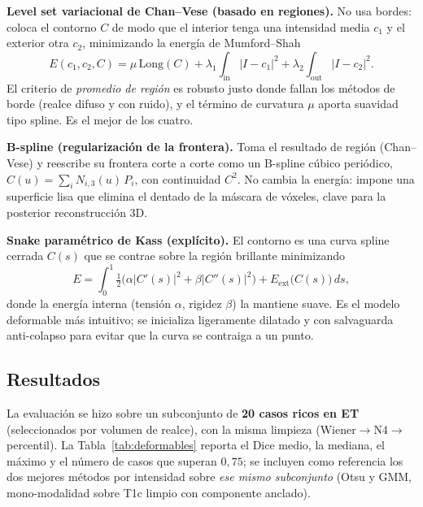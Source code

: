 \documentclass[conference]{IEEEtran}
\begin{document}
\textbf{Level set variacional de Chan--Vese (basado en regiones).} No usa
bordes: coloca el contorno $C$ de modo que el interior tenga una intensidad
media $c_1$ y el exterior otra $c_2$, minimizando la energía de Mumford--Shah
\begin{equation}
E(c_1,c_2,C)=\mu\,\mathrm{Long}(C)+
\lambda_1\!\!\int_{\mathrm{in}}\!\!|I-c_1|^2 +
\lambda_2\!\!\int_{\mathrm{out}}\!\!|I-c_2|^2 .
\end{equation}
El criterio de \emph{promedio de región} es robusto justo donde fallan los
métodos de borde (realce difuso y con ruido), y el término de curvatura $\mu$
aporta suavidad tipo spline. Es el mejor de los cuatro.

\textbf{B-spline (regularización de la frontera).} Toma el resultado de
región (Chan--Vese) y reescribe su frontera corte a corte como un B-spline
cúbico periódico, $C(u)=\sum_i N_{i,3}(u)\,P_i$, con continuidad $C^2$. No
cambia la energía: impone una superficie lisa que elimina el dentado de la
máscara de vóxeles, clave para la posterior reconstrucción 3D.

\textbf{Snake paramétrico de Kass (explícito).} El contorno es una curva
spline cerrada $C(s)$ que se contrae sobre la región brillante minimizando
\begin{equation}
E=\int_0^1 \tfrac12\big(\alpha|C'(s)|^2+\beta|C''(s)|^2\big) +
E_{\text{ext}}\!\big(C(s)\big)\,ds,
\end{equation}
donde la energía interna (tensión $\alpha$, rigidez $\beta$) la mantiene
suave. Es el modelo deformable más intuitivo; se inicializa ligeramente
dilatado y con salvaguarda anti-colapso para evitar que la curva se contraiga
a un punto.

\subsection{Resultados}
La evaluación se hizo sobre un subconjunto de \textbf{20 casos ricos en ET}
(seleccionados por volumen de realce), con la misma limpieza
(Wiener$\to$N4$\to$percentil). La Tabla~\ref{tab:deformables} reporta el Dice
medio, la mediana, el máximo y el número de casos que superan $0{,}75$; se
incluyen como referencia los dos mejores métodos por intensidad sobre
\emph{ese mismo subconjunto} (Otsu y GMM, mono-modalidad sobre T1c limpio con
componente anclado).
\end{document}
